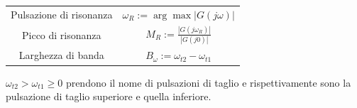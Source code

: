 \begin{table}[h!]
    \centering
    \begin{tabular}{| c | c |}
    \hline
        Pulsazione di risonanza & $\omega_R := \arg \max |G(j\omega)|$ \\
        Picco di risonanza & $M_R := \frac{|G(j\omega_R)|}{|G(j0)|}$ \\
        Larghezza di banda & $ B_{\omega} := \omega_{t2} - \omega_{t1} $ \\
    \hline
    \end{tabular}
\end{table}

$\omega_{t2} > \omega_{t1} \geq 0$ prendono il nome di pulsazioni di taglio e rispettivamente
sono la pulsazione di taglio superiore e quella inferiore.


